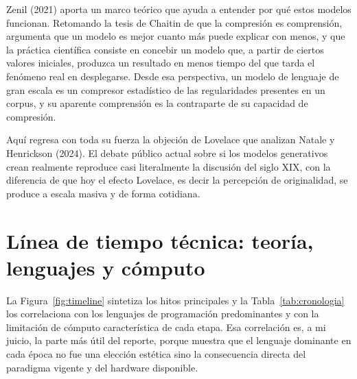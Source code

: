 \documentclass[12pt,letterpaper,oneside]{article}
\begin{document}
Zenil (2021) aporta un marco teórico que ayuda a entender por qué estos modelos funcionan. Retomando la tesis de Chaitin de que la compresión es comprensión, argumenta que un modelo es mejor cuanto más puede explicar con menos, y que la práctica científica consiste en concebir un modelo que, a partir de ciertos valores iniciales, produzca un resultado en menos tiempo del que tarda el fenómeno real en desplegarse. Desde esa perspectiva, un modelo de lenguaje de gran escala es un compresor estadístico de las regularidades presentes en un corpus, y su aparente comprensión es la contraparte de su capacidad de compresión.

Aquí regresa con toda su fuerza la objeción de Lovelace que analizan Natale y Henrickson (2024). El debate público actual sobre si los modelos generativos crean realmente reproduce casi literalmente la discusión del siglo XIX, con la diferencia de que hoy el efecto Lovelace, es decir la percepción de originalidad, se produce a escala masiva y de forma cotidiana.


\section{Línea de tiempo técnica: teoría, lenguajes y cómputo}

La Figura~\ref{fig:timeline} sintetiza los hitos principales y la Tabla~\ref{tab:cronologia} los correlaciona con los lenguajes de programación predominantes y con la limitación de cómputo característica de cada etapa. Esa correlación es, a mi juicio, la parte más útil del reporte, porque muestra que el lenguaje dominante en cada época no fue una elección estética sino la consecuencia directa del paradigma vigente y del hardware disponible.
\end{document}
